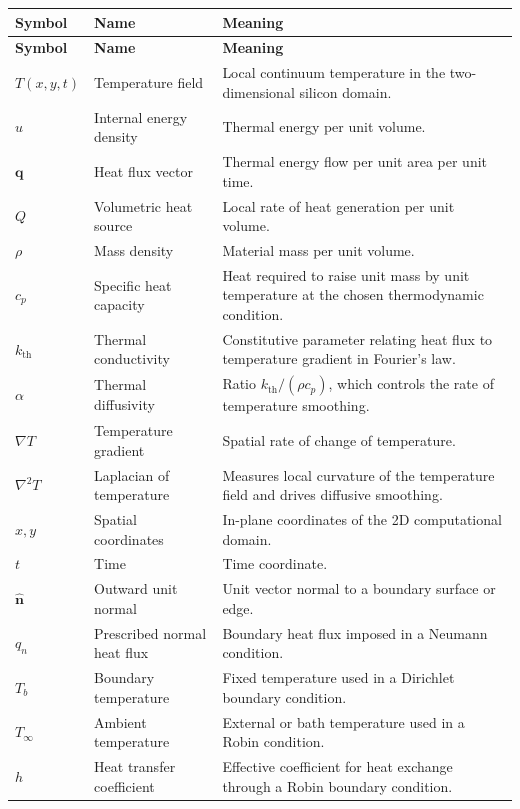 \documentclass[11pt]{article}
\newcommand{\qvec}{\mathbf{q}}
\newcommand{\nvec}{\hat{\mathbf{n}}}
\newcommand{\kth}{k_{\mathrm{th}}}
\begin{document}
\renewcommand{\arraystretch}{1.25}
\begin{longtable}{p{} p{} p{}}
\toprule
\textbf{Symbol} & \textbf{Name} & \textbf{Meaning} \\
\midrule
\endfirsthead
\toprule
\textbf{Symbol} & \textbf{Name} & \textbf{Meaning} \\
\midrule
\endhead
$T(x,y,t)$ & Temperature field & Local continuum temperature in the two-dimensional silicon domain. \\
$u$ & Internal energy density & Thermal energy per unit volume. \\
$\qvec$ & Heat flux vector & Thermal energy flow per unit area per unit time. \\
$Q$ & Volumetric heat source & Local rate of heat generation per unit volume. \\
$\rho$ & Mass density & Material mass per unit volume. \\
$c_p$ & Specific heat capacity & Heat required to raise unit mass by unit temperature at the chosen thermodynamic condition. \\
$\kth$ & Thermal conductivity & Constitutive parameter relating heat flux to temperature gradient in Fourier's law. \\
$\alpha$ & Thermal diffusivity & Ratio $\kth/(\rho c_p)$, which controls the rate of temperature smoothing. \\
$\nabla T$ & Temperature gradient & Spatial rate of change of temperature. \\
$\nabla^2 T$ & Laplacian of temperature & Measures local curvature of the temperature field and drives diffusive smoothing. \\
$x,y$ & Spatial coordinates & In-plane coordinates of the 2D computational domain. \\
$t$ & Time & Time coordinate. \\
$\nvec$ & Outward unit normal & Unit vector normal to a boundary surface or edge. \\
$q_n$ & Prescribed normal heat flux & Boundary heat flux imposed in a Neumann condition. \\
$T_b$ & Boundary temperature & Fixed temperature used in a Dirichlet boundary condition. \\
$T_\infty$ & Ambient temperature & External or bath temperature used in a Robin condition. \\
$h$ & Heat transfer coefficient & Effective coefficient for heat exchange through a Robin boundary condition. \\

\end{longtable}
\end{document}
